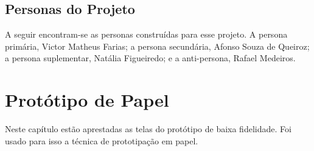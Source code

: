 \begin{apendicesenv}
\section{Personas do Projeto}
A seguir encontram-se as personas construídas para esse projeto. A persona primária, Victor Matheus Farias; a persona secundária, Afonso Souza de Queiroz; a persona suplementar, Natália Figueiredo; e a anti-persona, Rafael Medeiros.






\chapter{Protótipo de Papel}
\label{ap:proto_papel}

Neste capítulo estão aprestadas as telas do protótipo de baixa fidelidade. Foi usado para isso  a técnica de prototipação em papel.


\end{apendicesenv}

